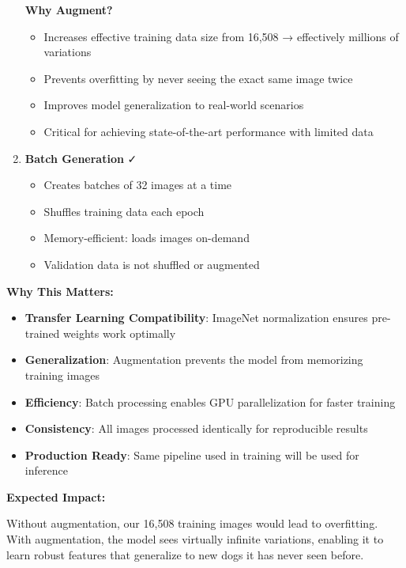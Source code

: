 \documentclass[
  letterpaper,
  DIV=11,
  numbers=noendperiod]{scrartcl}
\providecommand{\tightlist}{%
  \setlength{\itemsep}{0pt}\setlength{\parskip}{0pt}}
\begin{document}
\begin{enumerate}
  \textbf{Why Augment?}

  \begin{itemize}
  \tightlist
  \item
    Increases effective training data size from 16,508 → effectively
    millions of variations
  \item
    Prevents overfitting by never seeing the exact same image twice
  \item
    Improves model generalization to real-world scenarios
  \item
    Critical for achieving state-of-the-art performance with limited
    data
  \end{itemize}
\item
  \textbf{Batch Generation} ✓

  \begin{itemize}
  \tightlist
  \item
    Creates batches of 32 images at a time
  \item
    Shuffles training data each epoch
  \item
    Memory-efficient: loads images on-demand
  \item
    Validation data is not shuffled or augmented
  \end{itemize}
\end{enumerate}

\textbf{Why This Matters:}

\begin{itemize}
\tightlist
\item
  \textbf{Transfer Learning Compatibility}: ImageNet normalization
  ensures pre-trained weights work optimally
\item
  \textbf{Generalization}: Augmentation prevents the model from
  memorizing training images
\item
  \textbf{Efficiency}: Batch processing enables GPU parallelization for
  faster training
\item
  \textbf{Consistency}: All images processed identically for
  reproducible results
\item
  \textbf{Production Ready}: Same pipeline used in training will be used
  for inference
\end{itemize}

\textbf{Expected Impact:}

Without augmentation, our 16,508 training images would lead to
overfitting. With augmentation, the model sees virtually infinite
variations, enabling it to learn robust features that generalize to new
dogs it has never seen before.
\end{document}
